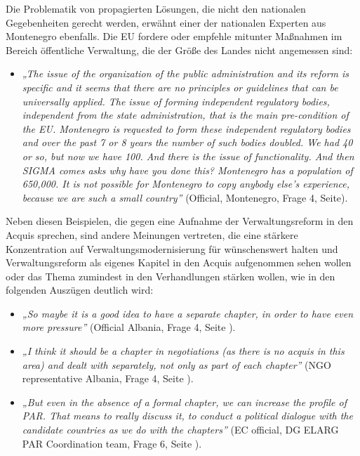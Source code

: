 Die Problematik von propagierten Lösungen, die nicht den nationalen Gegebenheiten gerecht werden, erwähnt einer der nationalen Experten aus Montenegro ebenfalls. Die EU fordere oder empfehle mitunter Maßnahmen im Bereich öffentliche Verwaltung, die der Größe des Landes nicht angemessen sind:
\begin{itemize}[label={}]
\item \textit{„The issue of the organization of the public administration and its reform is specific and it seems that there are no principles or guidelines that can be universally applied. The issue of forming independent regulatory bodies, independent from the state administration, that is the main pre-condition of the EU. Montenegro is requested to form these independent regulatory bodies and over the past 7 or 8 years the number of such bodies doubled. We had 40 or so, but now we have 100. And there is the issue of functionality. And then SIGMA comes asks why have you done this? Montenegro has a population of 650,000. It is not possible for Montenegro to copy anybody else’s experience, because we are such a small country”} (Official, Montenegro, Frage 4, Seite\pageref{sec:par chapter}).
\end{itemize}

Neben diesen Beispielen, die gegen eine Aufnahme der Verwaltungsreform in den Acquis sprechen, sind andere Meinungen vertreten, die eine stärkere Konzentration auf Verwaltungsmodernisierung für wünschenswert halten und Verwaltungsreform als eigenes Kapitel in den Acquis aufgenommen sehen wollen oder das Thema zumindest in den Verhandlungen stärken wollen, wie in den folgenden Auszügen deutlich wird:
\begin{itemize}[label={}]
\item \textit{„So maybe it is a good idea to have a separate chapter, in order to have even more pressure”} (Official Albania, Frage 4, Seite \pageref{sec:par chapter}).

\item \textit{ „I think it should be a chapter in negotiations (as there is no acquis in this area) and dealt with separately, not only as part of each chapter”} (NGO representative Albania, Frage 4, Seite \pageref{sec:par chapter}).

\item \textit{„But even in the absence of a formal chapter, we can increase the profile of PAR. That means to really discuss it, to conduct a political dialogue with the candidate countries as we do with the chapters”} (EC official, DG ELARG PAR Coordination team, Frage 6, Seite \pageref{sec:chapter}).
\end{itemize}


